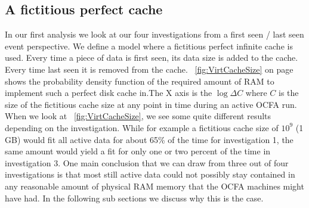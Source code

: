 \subsection{A fictitious perfect cache}
In our first analysis we look at our four investigations from a first seen / last seen event perspective. We define a model where a fictitious perfect infinite cache is used. Every time a piece of data is first seen, its data size is added to the cache. Every time last seen it is removed from the cache. ~\ref{fig:VirtCacheSize} on page ~\pageref{fig:VirtCacheSize} shows the probability density function of the required amount of RAM to implement such a perfect disk cache in.The X axis is the $\log{\Delta C}$ where $C$ is the size of the fictitious cache size at any point in time during an active OCFA run. When we look at ~\ref{fig:VirtCacheSize}, we see some quite different results depending on the investigation. While for example a fictitious cache size of $10^9$ (1 GB) would fit all active data for about 65\% of the time for investigation 1, the same amount would yield a fit for only one or two percent of the time in investigation 3. One main conclusion that we can draw from three out of four investigations is that most still active data could not possibly stay contained in any reasonable amount of physical RAM memory that the OCFA machines might have had. In the following sub sections we discuss why this is the case.
